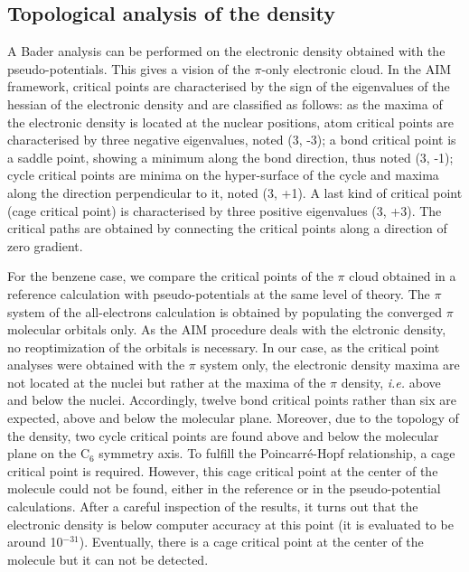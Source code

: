 \documentclass[12pt]{article}
\begin{document}
\subsection*{\sffamily \large Topological analysis of the density}
A Bader analysis can be performed on the electronic density obtained with the pseudo-potentials.\cite{bader}
This gives a vision of the $\pi$-only electronic cloud.
In the AIM framework, critical points are characterised by the sign of the eigenvalues of the hessian of 
the electronic density and are classified as follows:
as the maxima of the electronic density is located at the nuclear positions,
atom critical points are characterised by three negative eigenvalues, noted (3, -3);
a bond critical point is a saddle point, showing a minimum along the bond direction,
thus noted (3, -1); cycle critical points are minima on the hyper-surface of the cycle
and maxima along the direction perpendicular to it, noted (3, +1).
A last kind of critical point (cage critical point) is characterised by three positive eigenvalues
(3, +3).
The critical paths are obtained by connecting the critical points along a direction of zero gradient.

For the benzene case, we compare the critical points of the $\pi$ cloud obtained in a reference calculation
with pseudo-potentials at the same level of theory.
The $\pi$ system of the all-electrons calculation is obtained  by populating the converged $\pi$ molecular orbitals only.
As the AIM procedure deals with the elctronic density, no reoptimization of the orbitals is necessary.
In our case, as the critical point analyses were obtained
with the $\pi$ system only, the electronic density maxima are not
located at the nuclei but rather at the maxima of the $\pi$ density, 
\emph{i.e.} above and below the nuclei. %
Accordingly, twelve bond critical points rather than six are expected,
above and below the molecular plane.
Moreover, due to the topology of the density, two cycle critical points are found above and below the molecular
plane on the C$_6$ symmetry axis.
To fulfill the Poincarré-Hopf relationship, a cage critical point is required. However, this cage critical point 
at the center of the molecule could not be found, either in the reference or in the pseudo-potential 
calculations.
After a careful inspection of the results, it turns out that the electronic density
is below computer accuracy at this point (it is evaluated to be around 10$^{-31}$).
Eventually, there is a cage critical point at the center of
the molecule but it can not be detected.
\end{document}
